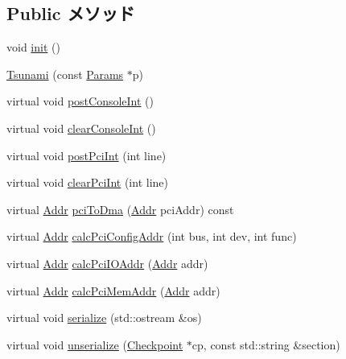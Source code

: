 \subsection*{Public メソッド}
\begin{DoxyCompactItemize}
\item 
void \hyperlink{classTsunami_a02fd73d861ef2e4aabb38c0c9ff82947}{init} ()
\item 
\hyperlink{classTsunami_a5243b59f52948d92f6ae8f98d0ff43a5}{Tsunami} (const \hyperlink{classTsunami_a7beeeed12982def83e22faf17f7385e1}{Params} $\ast$p)
\item 
virtual void \hyperlink{classTsunami_a5b278cebc0a62bc2195edf27f059ab1a}{postConsoleInt} ()
\item 
virtual void \hyperlink{classTsunami_ad38e46034c079c8e765d3ac7eb99337d}{clearConsoleInt} ()
\item 
virtual void \hyperlink{classTsunami_a545d1445357706d7259aa73104f44222}{postPciInt} (int line)
\item 
virtual void \hyperlink{classTsunami_a0d98ea2b236bb883fa15d63a59a2ec9e}{clearPciInt} (int line)
\item 
virtual \hyperlink{base_2types_8hh_af1bb03d6a4ee096394a6749f0a169232}{Addr} \hyperlink{classTsunami_a87078b3d3a28ae134f6736337e90dac3}{pciToDma} (\hyperlink{base_2types_8hh_af1bb03d6a4ee096394a6749f0a169232}{Addr} pciAddr) const 
\item 
virtual \hyperlink{base_2types_8hh_af1bb03d6a4ee096394a6749f0a169232}{Addr} \hyperlink{classTsunami_a5b8797a83289cb5fd895c9a5dc7eae6f}{calcPciConfigAddr} (int bus, int dev, int func)
\item 
virtual \hyperlink{base_2types_8hh_af1bb03d6a4ee096394a6749f0a169232}{Addr} \hyperlink{classTsunami_a83afd16479598cfaeb035fd30eeedd8b}{calcPciIOAddr} (\hyperlink{base_2types_8hh_af1bb03d6a4ee096394a6749f0a169232}{Addr} addr)
\item 
virtual \hyperlink{base_2types_8hh_af1bb03d6a4ee096394a6749f0a169232}{Addr} \hyperlink{classTsunami_aa2acd9bf04ba56b380e7812ce29971b5}{calcPciMemAddr} (\hyperlink{base_2types_8hh_af1bb03d6a4ee096394a6749f0a169232}{Addr} addr)
\item 
virtual void \hyperlink{classTsunami_a53e036786d17361be4c7320d39c99b84}{serialize} (std::ostream \&os)
\item 
virtual void \hyperlink{classTsunami_af22e5d6d660b97db37003ac61ac4ee49}{unserialize} (\hyperlink{classCheckpoint}{Checkpoint} $\ast$cp, const std::string \&section)
\end{DoxyCompactItemize}
